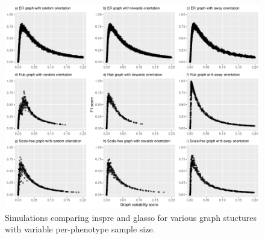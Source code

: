 \documentclass{article}
\begin{document}
\newpage
\begin{figure}[H]\label{figureS3}
\includegraphics[width=\textwidth]{figures/figure_S3.png}
\caption{Simulations comparing inspre and glasso for various graph stuctures
with variable per-phenotype sample size.}
\end{figure}
\end{document}
